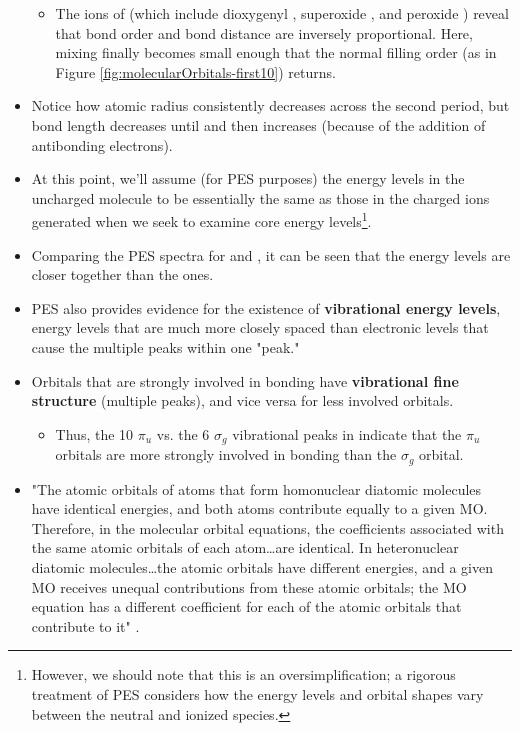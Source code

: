 \documentclass[../notes.tex]{subfiles}
\begin{document}
\begin{itemize}
\begin{itemize}
\begin{itemize}
        \end{itemize}
        \item The ions of  (which include dioxygenyl , superoxide , and peroxide ) reveal that bond order and bond distance are inversely proportional. Here, mixing finally becomes small enough that the normal filling order (as in Figure \ref{fig:molecularOrbitals-first10}) returns.
    \end{itemize}
    \item Notice how atomic radius consistently decreases across the second period, but bond length decreases until  and then increases (because of the addition of antibonding electrons).
    \item At this point, we'll assume (for PES purposes) the energy levels in the uncharged molecule to be essentially the same as those in the charged ions generated when we seek to examine core energy levels\footnote{However, we should note that this is an oversimplification; a rigorous treatment of PES considers how the energy levels and orbital shapes vary between the neutral and ionized species.}.
    \item Comparing the PES spectra for  and , it can be seen that the  energy levels are closer together than the  ones.
    \item PES also provides evidence for the existence of \textbf{vibrational energy levels}, energy levels that are much more closely spaced than electronic levels that cause the multiple peaks within one "peak."
    \item Orbitals that are strongly involved in bonding have \textbf{vibrational fine structure} (multiple peaks), and vice versa for less involved orbitals.
    \begin{itemize}
        \item Thus, the 10 $\pi_u$ vs. the 6 $\sigma_g$ vibrational peaks in  indicate that the $\pi_u$ orbitals are more strongly involved in bonding than the $\sigma_g$ orbital.
    \end{itemize}
    \item "The atomic orbitals of atoms that form homonuclear diatomic molecules have identical energies, and both atoms contribute equally to a given MO. Therefore, in the molecular orbital equations, the coefficients associated with the same atomic orbitals of each atom\dots are identical. In heteronuclear diatomic molecules\dots the atomic orbitals have different energies, and a given MO receives unequal contributions from these atomic orbitals; the MO equation has a different coefficient for each of the atomic orbitals that contribute to it" \parencite[134,136]{bib:MiesslerFischerTarr}.

\end{itemize}
\end{document}
